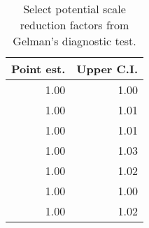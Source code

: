 \begin{table}[h]
\centering
\begin{tabular}{rr}
  \hline
Point est. & Upper C.I. \\ 
  \hline
1.00 & 1.00 \\ 
  1.00 & 1.01 \\ 
  1.00 & 1.01 \\ 
  1.00 & 1.03 \\ 
  1.00 & 1.02 \\ 
  1.00 & 1.00 \\ 
  1.00 & 1.02 \\ 
   \hline
\end{tabular}
\caption{Select potential scale reduction factors from Gelman's diagnostic test.} 
\label{tab:gelman}
\end{table}
